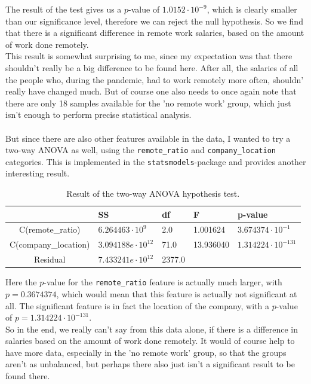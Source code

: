 \documentclass{article}
\begin{document}
The result of the test gives us a $p$-value of $1.0152 \cdot 10^{-9}$, which is clearly smaller than our significance level, therefore we can reject the null hypothesis. So we find that there is a significant difference in remote work salaries, based on the amount of work done remotely. \\
This result is somewhat surprising to me, since my expectation was that there shouldn't really be a big difference to be found here. After all, the salaries of all the people who, during the pandemic, had to work remotely more often, shouldn' really have changed much. But of course one also needs to once again note that there are only 18 samples available for the 'no remote work' group, which just isn't enough to perform precise statistical analysis. \\ \\
But since there are also other features available in the data, I wanted to try a two-way ANOVA as well, using the \texttt{remote\_ratio} and \texttt{company\_location} categories. This is implemented in the \texttt{statsmodels}-package \citep{seabold2010statsmodels} and provides another interesting result.


\begin{table}[h!]
  \caption{Result of the two-way ANOVA hypothesis test.}
  \label{sample-table}
  \centering
  \begin{tabular}{cllll}
&						SS	&		df 		&F 			&p-value \\
\midrule
C(remote\_ratio) &		$6.264463 \cdot 10^9$ &	2.0 	&1.001624 &	$3.674374 \cdot 10^{-1}$ \\
C(company\_location) &	$3.094188e \cdot 10^{12}$ &	71.0 	&13.936040 &	$1.314224 \cdot 10^{-131}$ \\
Residual 		&		$7.433241e \cdot 10^{12}$ &	2377.0 	& & \\
    \bottomrule
  \end{tabular}
\end{table}

Here the $p$-value for the \texttt{remote\_ratio} feature is actually much larger, with $p = 0.3674374$, which would mean that this feature is actually not significant at all. The significant feature is in fact the location of the company, with a $p$-value of $p = 1.314224 \cdot 10^{-131}$. \\

So in the end, we really can't say from this data alone, if there is a difference in salaries based on the amount of work done remotely. It would of course help to have more data, especially in the 'no remote work' group, so that the groups aren't as unbalanced, but perhaps there also just isn't a significant result to be found there.


\end{document}
